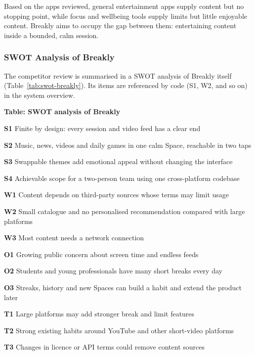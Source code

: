Based on the apps reviewed, general entertainment apps supply content but no
stopping point, while focus and wellbeing tools supply limits but little
enjoyable content. Breakly aims to occupy the gap between them: entertaining
content inside a bounded, calm session.

\subsubsection{SWOT Analysis of Breakly}
\label{sec:swot-breakly}

The competitor review is summarised in a SWOT analysis of Breakly itself
(Table~\ref{tab:swot-breakly}). Its items are referenced by code (S1, W2,
and so on) in the system overview.

\noindent\textbf{Table: SWOT analysis of Breakly}\label{tab:swot-breakly}\par
  \swotbox
    {\item \textbf{S1} Finite by design: every session and video feed has a clear end
     \item \textbf{S2} Music, news, videos and daily games in one calm Space, reachable in two taps
     \item \textbf{S3} Swappable themes add emotional appeal without changing the interface
     \item \textbf{S4} Achievable scope for a two-person team using one cross-platform codebase}
    {\item \textbf{W1} Content depends on third-party sources whose terms may limit usage
     \item \textbf{W2} Small catalogue and no personalised recommendation compared with large platforms
     \item \textbf{W3} Most content needs a network connection}
    {\item \textbf{O1} Growing public concern about screen time and endless feeds
     \item \textbf{O2} Students and young professionals have many short breaks every day
     \item \textbf{O3} Streaks, history and new Spaces can build a habit and extend the product later}
    {\item \textbf{T1} Large platforms may add stronger break and limit features
     \item \textbf{T2} Strong existing habits around YouTube and other short-video platforms
     \item \textbf{T3} Changes in licence or API terms could remove content sources}

